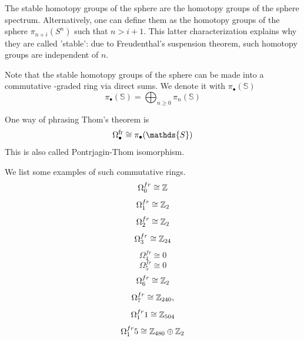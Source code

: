 \begin{notat}
    The stable homotopy groups of the sphere are the homotopy groups of the sphere spectrum. Alternatively, one can define them as the homotopy groups of the sphere $\pi_{n+i}(S^n)$ such that $n>i+1$. This latter
     characterization explains why they are called 'stable': due to Freudenthal's suspension theorem, such homotopy
     groups are independent of $n$.
\end{notat}
\begin{rem}
Note that the stable homotopy groups of the sphere can be made into a commutative \Z-graded ring via direct sums. We denote it with $\pi_{\bullet}(\mathds{S})$
$$\pi_{\bullet}(\mathds{S})=\bigoplus_{n\geq 0}\pi_{n}(\mathds{S})$$
\end{rem}
\begin{thm}
    One way of phrasing Thom's theorem is
    $$\Omega_{\bullet}^{\fr}\cong\pi_{\bullet}(\mathds{S})$$
    This is also called Pontrjagin-Thom isomorphism.
\end{thm}
\begin{ex}
 We list some examples of such commutative rings.
 $$    \Omega^{fr}_0 \cong\mathbb{Z}$$
  $$\Omega^{fr}_1 \cong\mathbb{Z}_2$$
  $$\Omega^{fr}_2 \cong \mathbb{Z}_2 $$
  $$\Omega^{fr}_3 \cong\mathbb{Z}_{24}$$
  $$\Omega^{fr}_4 \cong 0$$
  $$\Omega^{fr}_5 \cong 0$$
  $$\Omega^{fr}_6 \cong\mathbb{Z}_2$$
  $$\Omega^{fr}_7 \cong \mathbb{Z}_{240},$$
  $$\Omega^{fr}_11 \cong\mathbb{Z}_{504}$$
  $$\Omega^{fr}_15 \cong\mathbb{Z}_{480}\oplus\mathbb{Z}_2$$
\end{ex}
